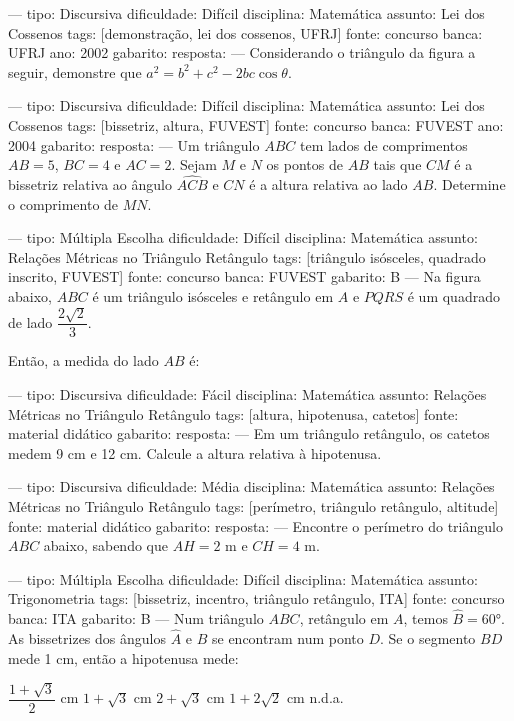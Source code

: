 ---
tipo: Discursiva
dificuldade: Difícil
disciplina: Matemática
assunto: Lei dos Cossenos
tags: [demonstração, lei dos cossenos, UFRJ]
fonte: concurso
banca: UFRJ
ano: 2002
gabarito:
resposta:
---
\question
Considerando o triângulo da figura a seguir, demonstre que $a^2 = b^2 + c^2 - 2bc\cos\theta$.


---
tipo: Discursiva
dificuldade: Difícil
disciplina: Matemática
assunto: Lei dos Cossenos
tags: [bissetriz, altura, FUVEST]
fonte: concurso
banca: FUVEST
ano: 2004
gabarito:
resposta:
---
\question
Um triângulo $ABC$ tem lados de comprimentos $AB = 5$, $BC = 4$ e $AC = 2$. Sejam $M$ e $N$ os pontos de $AB$ tais que $CM$ é a bissetriz relativa ao ângulo $\widehat{ACB}$ e $CN$ é a altura relativa ao lado $AB$. Determine o comprimento de $MN$.

---
tipo: Múltipla Escolha
dificuldade: Difícil
disciplina: Matemática
assunto: Relações Métricas no Triângulo Retângulo
tags: [triângulo isósceles, quadrado inscrito, FUVEST]
fonte: concurso
banca: FUVEST
gabarito: B
---
\question
Na figura abaixo, $ABC$ é um triângulo isósceles e retângulo em $A$ e $PQRS$ é um quadrado de lado $\dfrac{2\sqrt{2}}{3}$.


Então, a medida do lado $AB$ é:
\begin{choices}
\end{choices}

---
tipo: Discursiva
dificuldade: Fácil
disciplina: Matemática
assunto: Relações Métricas no Triângulo Retângulo
tags: [altura, hipotenusa, catetos]
fonte: material didático
gabarito:
resposta:
---
\question
Em um triângulo retângulo, os catetos medem 9 cm e 12 cm. Calcule a altura relativa à hipotenusa.

---
tipo: Discursiva
dificuldade: Média
disciplina: Matemática
assunto: Relações Métricas no Triângulo Retângulo
tags: [perímetro, triângulo retângulo, altitude]
fonte: material didático
gabarito:
resposta:
---
\question
Encontre o perímetro do triângulo $ABC$ abaixo, sabendo que $AH = 2$ m e $CH = 4$ m.


---
tipo: Múltipla Escolha
dificuldade: Difícil
disciplina: Matemática
assunto: Trigonometria
tags: [bissetriz, incentro, triângulo retângulo, ITA]
fonte: concurso
banca: ITA
gabarito: B
---
\question
Num triângulo $ABC$, retângulo em $A$, temos $\hat{B} = 60°$. As bissetrizes dos ângulos $\hat{A}$ e $\hat{B}$ se encontram num ponto $D$. Se o segmento $BD$ mede 1 cm, então a hipotenusa mede:
\begin{choices}
\choice $\dfrac{1 + \sqrt{3}}{2}$ cm
\correctchoice $1 + \sqrt{3}$ cm
\choice $2 + \sqrt{3}$ cm
\choice $1 + 2\sqrt{2}$ cm
\choice n.d.a.
\end{choices}

